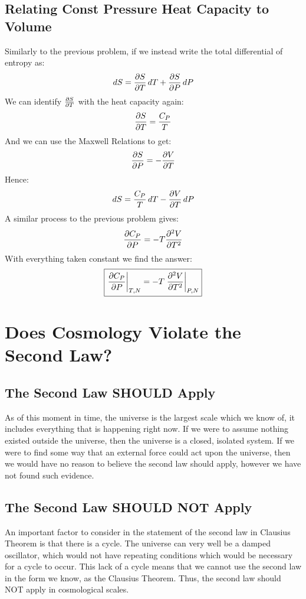 \documentclass[12pt]{article}
\begin{document}
\subsection{Relating Const Pressure Heat Capacity to Volume}
Similarly to the previous problem, if we instead write the total differential of entropy as:
\begin{align*}
  \dd{S}=\pdv{S}{T}\dd{T}+\pdv{S}{P}\dd{P}
\end{align*}
We can identify $\pdv{S}{T}$ with the heat capacity again:
\begin{align*}
  \pdv{S}{T}=\frac{C_P}{T}
\end{align*}
And we can use the Maxwell Relations to get:
\begin{align*}
  \pdv{S}{P}=-\pdv{V}{T}
\end{align*}
Hence:
\begin{align*}
  \dd{S}=\frac{C_P}{T}\dd{T}-\pdv{V}{T}\dd{P}
\end{align*}
A similar process to the previous problem gives:
\begin{align*}
  \pdv{C_P}{P}=-T\pdv[2]{V}{T}
\end{align*}
With everything taken constant we find the answer:
\begin{align}
  \boxed{\eval{\pdv{C_P}{P}}_{T,N}=-T\eval{\pdv[2]{V}{T}}_{P,N}}
\end{align}
\newpage
\section{Does Cosmology Violate the Second Law?}
\subsection{The Second Law SHOULD Apply}
As of this moment in time, the universe is the largest scale which we know of, it includes everything that is happening right now. If we were to assume nothing existed outside the universe, then the universe is a closed, isolated system. If we were to find some way that an external force could act upon the universe, then we would have no reason to believe the second law should apply, however we have not found such evidence. 
\subsection{The Second Law SHOULD NOT Apply}
An important factor to consider in the statement of the second law in Clausius Theorem is that there is a cycle. The universe can very well be a damped oscillator, which would not have repeating conditions which would be necessary for a cycle to occur. This lack of a cycle means that we cannot use the second law in the form we know, as the Clausius Theorem. Thus, the second law should NOT apply in cosmological scales.
\end{document}
